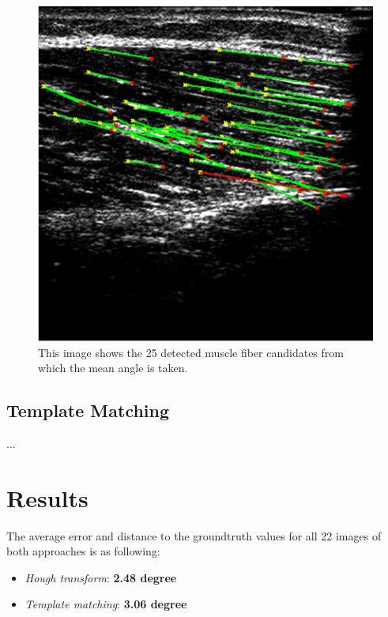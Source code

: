 \documentclass[10pt,twocolumn,letterpaper]{article}
\begin{document}
\begin{figure}
	\begin{center}		
		\includegraphics[width=1\linewidth]{img/im1_hough_fibers}
	\end{center}
	\caption{This image shows the 25 detected muscle fiber candidates from which the mean angle is taken.}
	\label{fig:im1_hough_fibers}
	
\end{figure}

\subsection{Template Matching}
...

\section{Results}
The average error and distance to the groundtruth values for all 22 images of both approaches is as following: 

\begin{itemize}
     \item \emph{Hough transform}: \textbf{2.48 degree}
     \item \emph{Template matching}: \textbf{3.06 degree}
\end{itemize}
\end{document}
